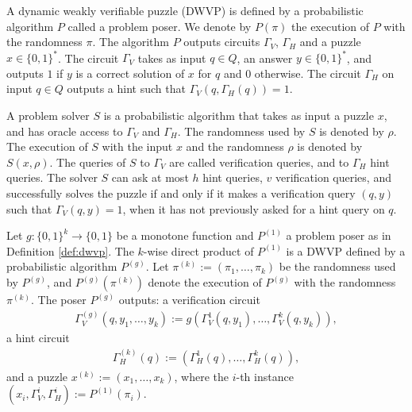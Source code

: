 \begin{definition}
  \label{def:dwvp}
  A dynamic weakly verifiable puzzle (DWVP) is defined by a probabilistic algorithm $P$
  called a problem poser.
  We denote by $P(\pi)$ the execution of $P$ with the randomness $\pi$.
  The algorithm $P$ outputs circuits $\Gamma_{V}$, $\Gamma_{H}$ and a puzzle $x \in \{0,1\}^{*}$.
  The circuit $\Gamma_{V}$ takes as input $q \in Q$, an answer $y \in \{0,1\}^*$,
  and outputs $1$ if $y$ is a correct solution of $x$ for $q$ and $0$ otherwise.
  The circuit $\Gamma_H$ on input $q \in Q$ outputs a hint such that $\Gamma_V(q,\Gamma_H(q)) = 1$.

  A problem solver $S$ is a probabilistic algorithm that takes as input a puzzle $x$,
  and has oracle access to $\Gamma_V$ and $\Gamma_H$.
  The randomness used by $S$ is denoted by $\rho$. The execution of $S$ with the input $x$ and the randomness $\rho$
  is denoted by $S(x, \rho)$. The queries of $S$ to $\Gamma_V$ are called verification queries, and to $\Gamma_H$ hint queries.
  The solver $S$ can ask at most $h$ hint queries, $v$ verification queries, and successfully solves the puzzle if and only if
  it makes a verification query $(q,y)$ such that $\Gamma_V(q,y) = 1$, when it has not previously asked for a hint query on $q$.
\end{definition}
%
%
\begin{definition}
Let $g: \{0,1\}^{k} \rightarrow \{0,1\}$ be a monotone function and $P^{(1)}$ a problem poser as in Definition \ref{def:dwvp}.
The $k$-wise direct product of $P^{(1)}$ is a DWVP defined by a probabilistic algorithm $P^{(g)}$.
Let $\pi^{(k)} := (\pi_1, \dots, \pi_k)$ be the randomness used by $P^{(g)}$, and $P^{(g)}(\pi^{(k)})$ denote the execution of $P^{(g)}$ with the randomness $\pi^{(k)}$.
The poser $P^{(g)}$ outputs:
a verification circuit
\begin{align*}
  \Gamma_V^{(g)} (q, y_1, \dots, y_k) := g(\Gamma_V^{1}(q, y_1), \dots, \Gamma_V^{k}(q, y_k)),
\end{align*}
a hint circuit
\begin{align*}
  \Gamma_H^{(k)} (q) := (\Gamma_H^{1}(q), \dots, \Gamma_H^{k}(q)),
\end{align*}
and a puzzle $x^{(k)} := (x_1, \dots, x_k)$, where the $i$-th instance $(x_i, \Gamma_V^{i}, \Gamma_H^{i} ) := P^{(1)}(\pi_i)$.

\end{definition}
